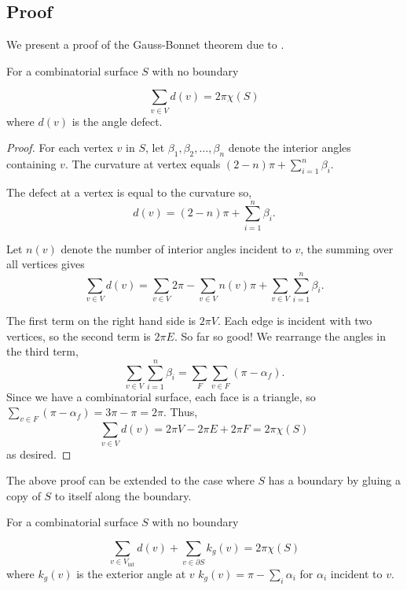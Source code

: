 \subsection{Proof}
\label{sec:proof}


We present a proof of the Gauss-Bonnet theorem due to \cite{upadhyay2015}.



\begin{theorem}\label{thm:g-b-discete-bdy}
For a combinatorial surface $S$ with no boundary

$$\sum_{v\in V} d(v)=2\pi \chi(S)$$
where $d(v)$ is the angle defect.
\end{theorem}

\begin{proof}

For each vertex $v$ in $S$,
let $\beta_1,\beta_2,\ldots,\beta_n$ denote the interior angles
containing $v$.
The curvature at vertex equals $(2-n)\pi +\sum_{i=1}^n \beta_i$.

The defect  at a vertex is equal to the curvature so,
 $$d(v)=(2-n)\pi +\sum_{i=1}^n \beta_i.$$

Let $n(v)$ denote the number of interior angles incident to $v$, the summing over all vertices gives
$$\sum_{v\in V} d(v)=\sum_{v\in V}2\pi - \sum_{v\in V}n(v)\pi+\sum_{v\in V}\sum_{i=1}^n \beta_i.$$

The first term on the right hand side is $2\pi V$. Each edge is incident with two vertices, so the second
term is $2\pi E$. So far so good!
We rearrange the angles in the third term,
$$ \sum_{v\in V}\sum_{i=1}^n \beta_i=\sum_F\sum_{v\in F}(\pi-\alpha_f).$$
Since we have a combinatorial surface, each face is a triangle,
so $\sum_{v\in F}(\pi-\alpha_f)=3\pi-\pi=2\pi.$
Thus, $$\sum_{v\in V} d(v)=2\pi V-2\pi E+2\pi F=2\pi \chi(S)$$ as desired.
\end{proof}

The above proof can be extended to the case where $S$ has a boundary
by gluing a copy of $S$ to itself along the boundary.

\begin{theorem}\label{thm:g-b-discete}
For a combinatorial surface $S$ with no boundary

$$\sum_{v\in V_{\text{int}}} d(v)+\sum_{v\in\partial S}k_g(v)=2\pi \chi(S)$$
where $k_g(v)$ is the exterior angle at $v$ 
$k_g(v)=\pi-\sum_i\alpha_i$ for $\alpha_i$ incident to $v$.
\end{theorem}


